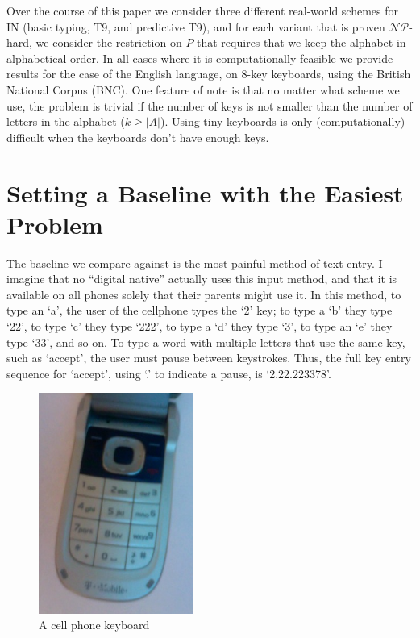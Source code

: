 \documentclass[runningheads]{llncs}
\newcommand{\NP}{\ensuremath{\mathcal{NP}}}
\begin{document}
Over the course of this paper we consider three different real-world
schemes for $\mathrm{IN}$ (basic typing, T9, and predictive T9), and for each
variant that is proven \NP-hard, we consider the restriction on $P$ that
requires that we keep the alphabet in alphabetical order.  In all cases
where it is computationally feasible we provide results for the case of
the English language, on 8-key keyboards, using the British National
Corpus\cite{bnc} (BNC).  One feature of note is that no matter what scheme we
use, the problem is trivial if the number of keys is not smaller than the
number of letters in the alphabet ($k \ge |A|$).  Using tiny keyboards is only
(computationally) difficult when the keyboards don't have enough keys.

\section{Setting a Baseline with the Easiest Problem}

The baseline we compare against is the most painful method of text entry.  I
imagine that no ``digital native'' actually uses this input method, and that it
is available on all phones solely that their parents might use it.  In this
method, to type an `a', the user of the cellphone types the `2' key; to type a
`b' they type `22', to type `c' they type `222', to type a `d' they type `3',
to type an `e' they type `33', and so on.  To type a word with multiple
letters that use the same key, such as `accept', the user must pause
between keystrokes.  Thus, the full key entry sequence for `accept', using
`.' to indicate a pause, is `2.22.223378'.

\begin{figure}
\includegraphics[width=2in]{phonekeys.jpg}
\caption{A cell phone keyboard}
\label{keypic}
\end{figure}
\end{document}
